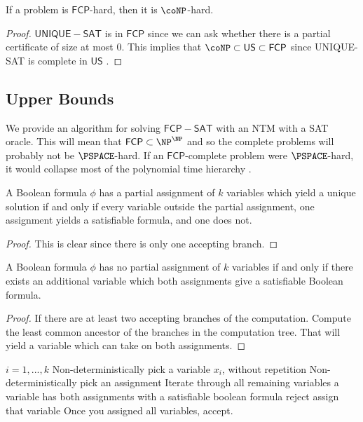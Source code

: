 \documentclass[runningheads,a4paper]{llncs}
\begin{document}
\begin{proposition}
If a problem is $\mathsf{FCP}$-hard, then it is $\coNP$-hard. 
\end{proposition}

\begin{proof}
$\mathsf{UNIQUE-SAT}$ is in $\mathsf{FCP}$ since we can ask whether there is a partial certificate of size at most $0$. This implies that $\coNP \subset \mathsf{US} \subset \mathsf{FCP}$ since UNIQUE-SAT is complete in $\mathsf{US}$ \cite{blass1982unique}.
\end{proof}

\subsection{Upper Bounds}

We provide an algorithm for solving $\mathsf{FCP-SAT}$ with an NTM with a SAT oracle. This will mean that $\mathsf{FCP} \subset \NP^{\NP}$ and so the complete problems will probably not be $\PSPACE$-hard. If an $\mathsf{FCP}$-complete problem were $\PSPACE$-hard, it would collapse most of the polynomial time hierarchy \cite{stockmeyer1976polynomial}. 

\begin{lemma}
A Boolean formula $\phi$ has a partial assignment of $k$ variables which yield a unique solution if and only if every variable outside the partial assignment, one assignment yields a satisfiable formula, and one does not.
\end{lemma}

\begin{proof}
This is clear since there is only one accepting branch.
\end{proof}

\begin{lemma}
A Boolean formula $\phi$ has no partial assignment of $k$ variables if and only if there exists an additional variable which both assignments give a satisfiable Boolean formula.
\end{lemma}

\begin{proof}
If there are at least two accepting branches of the computation. Compute the least common ancestor of the branches in the computation tree. That will yield a variable which can take on both assignments. 
\end{proof}

\begin{codebox}
\li \For $i = 1, ..., k$ \Then
\li Non-deterministically pick a variable $x_i$, without repetition
\li Non-deterministically pick an assignment \End
\li Iterate through all remaining variables \Then
\li \If a variable has both assignments with a satisfiable boolean formula \Then
\li reject
\li \Else assign that variable \End \End
\li Once you assigned all variables, accept.
\end{codebox}
\end{document}
